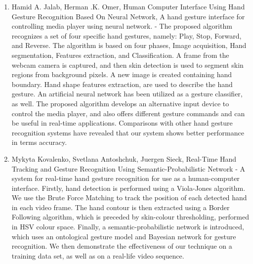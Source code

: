 \documentclass[11pt]{report}
\begin{document}
\begin{enumerate}
    \item Hamid A. Jalab, Herman .K. Omer, Human Computer Interface Using Hand Gesture Recognition Based On Neural Network, A hand gesture interface for controlling media player using neural network. \cite{8} - The proposed algorithm recognizes a set of four specific hand gestures, namely: Play, Stop, Forward, and Reverse. The algorithm is based on four phases, Image acquisition, Hand segmentation, Features extraction, and Classification. A frame from the webcam camera is captured, and then skin detection is used to segment skin regions from background pixels. A new image is created containing hand boundary. Hand shape features extraction, are used to describe the hand gesture. An artificial neural network has been utilized as a gesture classifier, as well. The proposed algorithm develops an alternative input device to control the media player, and also offers different gesture commands and can be useful in real-time applications. Comparisons with other hand gesture recognition systems have revealed that our system shows better performance in terms accuracy.
    
    \item Mykyta Kovalenko, Svetlana Antoshchuk, Juergen Sieck, Real-Time Hand Tracking and Gesture Recognition Using Semantic-Probabilistic Network \cite{9} - A system for real-time hand gesture  recognition  for use  as  a  human-computer  interface.  Firstly,   hand   detection   is   performed   using   a   Viola-Jones   algorithm.  We  use  the  Brute Force Matching  to  track  the  position  of  each  detected  hand  in  each  video  frame.  The  hand  contour  is  then  extracted  using  a  Border  Following  algorithm,  which  is  preceded  by  skin-colour   thresholding, performed   in   HSV   colour   space.   Finally,  a  semantic-probabilistic  network  is  introduced,  which  uses  an  ontological  gesture  model  and  Bayesian  network  for  gesture  recognition.  We  then  demonstrate  the  effectiveness  of  our  technique  on  a  training  data  set,  as  well  as  on a  real-life video sequence.
    

\end{enumerate}
\end{document}
